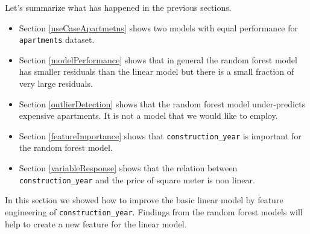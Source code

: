 \documentclass[]{book}
\newenvironment{Shaded}{\begin{snugshade}}{\end{snugshade}}
\newcommand{\DataTypeTok}[1]{\textcolor[rgb]{0.13,0.29,0.53}{#1}}
\newcommand{\DecValTok}[1]{\textcolor[rgb]{0.00,0.00,0.81}{#1}}
\newcommand{\KeywordTok}[1]{\textcolor[rgb]{0.13,0.29,0.53}{\textbf{#1}}}
\newcommand{\NormalTok}[1]{#1}
\newcommand{\OperatorTok}[1]{\textcolor[rgb]{0.81,0.36,0.00}{\textbf{#1}}}
\newcommand{\StringTok}[1]{\textcolor[rgb]{0.31,0.60,0.02}{#1}}
\providecommand{\tightlist}{%
  \setlength{\itemsep}{0pt}\setlength{\parskip}{0pt}}
\theoremstyle{definition}
\theoremstyle{definition}
\theoremstyle{definition}
\theoremstyle{remark}
\begin{document}
Let's summarize what has happened in the previous sections.

\begin{itemize}
\tightlist
\item
  Section \ref{useCaseApartmetns} shows two models with equal
  performance for \texttt{apartments} dataset.
\item
  Section \ref{modelPerformance} shows that in general the random forest
  model has smaller residuals than the linear model but there is a small
  fraction of very large residuals.
\item
  Section \ref{outlierDetection} shows that the random forest model
  under-predicts expensive apartments. It is not a model that we would
  like to employ.
\item
  Section \ref{featureImportance} shows that \texttt{construction\_year}
  is important for the random forest model.
\item
  Section \ref{variableResponse} shows that the relation between
  \texttt{construction\_year} and the price of square meter is non
  linear.
\end{itemize}

In this section we showed how to improve the basic linear model by
feature engineering of \texttt{construction\_year}. Findings from the
random forest models will help to create a new feature for the linear
model.

\begin{Shaded}
\end{Shaded}
\end{document}
